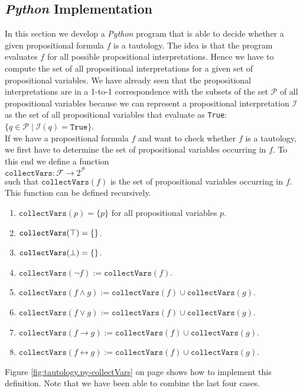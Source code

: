 \subsection{\textsl{Python} Implementation}
In this section we develop a \textsl{Python} program that is able to decide whether a given propositional
formula $f$ is a tautology.  The idea is that the program evaluates $f$ for all possible propositional
interpretations.  Hence we have to compute the set of all propositional interpretations for a given set of
propositional variables.  We have already seen that the propositional interpretations are in a 1-to-1
correspondence with the subsets of the set $\mathcal{P}$ of all propositional variables because we can
represent a propositional interpretation $\mathcal{I}$ as the set of all propositional variables that evaluate
as \texttt{True}:
\\[0.2cm]
\hspace*{1.3cm}
$\bigl\{ q \in \mathcal{P} \mid \mathcal{I}(q) = \mathtt{True} \bigr\}$.
\\[0.2cm]
If we have a propositional formula $f$ and want to check whether $f$ is a tautology, we first have to determine
the set of propositional variables occurring in $f$.
To this end we define a function
\\[0.2cm]
\hspace*{1.3cm}
$\texttt{collectVars}: \mathcal{F} \rightarrow 2^{\mathcal{P}}$
\\[0.2cm]
such that $\mathtt{collectVars}(f)$ is the set of propositional variables occurring in $f$.  This function can
be defined recursively.
\begin{enumerate}
\item $\mathtt{collectVars}(p) = \{ p \}$ \quad for all propositional variables $p$.
\item $\mathtt{collectVars}(\top) = \{\}$.
\item $\mathtt{collectVars}(\bot) = \{\}$.
\item $\mathtt{collectVars}(\neg f) := \mathtt{collectVars}(f)$.
\item $\mathtt{collectVars}(f \wedge g) := \mathtt{collectVars}(f) \cup \mathtt{collectVars}(g)$.
\item $\mathtt{collectVars}(f \vee g) := \mathtt{collectVars}(f) \cup \mathtt{collectVars}(g)$.
\item $\mathtt{collectVars}(f \rightarrow g) := \mathtt{collectVars}(f) \cup \mathtt{collectVars}(g)$.
\item $\mathtt{collectVars}(f \leftrightarrow g) := \mathtt{collectVars}(f) \cup \mathtt{collectVars}(g)$.
\end{enumerate}
Figure \ref{fig:tautology.py-collectVars} on page \pageref{fig:tautology.py-collectVars} shows how to implement
this definition.  Note that we have been able to combine the last four cases.

